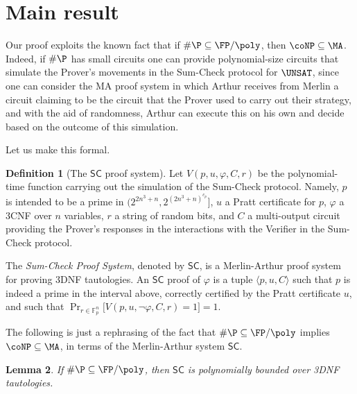 \documentclass[11pt]{article}
\renewcommand{\SC}{\mathsf{SC}}
\theoremstyle{definition}
\newtheorem{definition}{Definition}[section]
\theoremstyle{plain}
\newtheorem{lemma}[definition]{Lemma}
\theoremstyle{remark}
\newcommand{\bF}{\mathbb{F}}
\begin{document}
\section{Main result}
Our proof exploits the known fact that if $\#\P \subseteq \FP/\poly$, then $\coNP \subseteq \MA$. Indeed, if $\#\P$ has small circuits one can provide polynomial-size circuits that simulate the Prover's movements in the Sum-Check protocol for $\UNSAT$, since one can consider the MA proof system in which Arthur receives from Merlin a circuit claiming to be the circuit that the Prover used to carry out their strategy, and with the aid of randomness, Arthur can execute this on his own and decide based on the outcome of this simulation.

Let us make this formal.

\begin{definition}[The $\SC$ proof system]\label{def:sc}
Let $V(p, u, \varphi, C, r)$ be the polynomial-time function carrying out the simulation of the Sum-Check protocol. Namely, $p$ is intended to be a prime in $(2^{2n^3 + n}, 2^{{(2n^3+n)}^{c_p}}]$, $u$ a Pratt certificate for $p$, $\varphi$ a 3CNF over $n$ variables, $r$ a string of random bits, and $C$ a multi-output circuit providing the Prover's responses in the interactions with the Verifier in the Sum-Check protocol.

The \emph{Sum-Check Proof System}, denoted by $\SC$, is a Merlin-Arthur proof system for proving 3DNF tautologies. An $\SC$ proof of $\varphi$ is a tuple $\langle p,u, C \rangle$ such that $p$ is indeed a prime in the interval above, correctly certified by the Pratt certificate $u$, and such that $\Pr_{r\in\bF_p^n}\big[V(p,u,\neg\varphi,C,r)=1\big]=1$.
\end{definition}

The following is just a rephrasing of the fact that $\#\P \subseteq \FP/\poly$ implies $\coNP \subseteq \MA$, in terms of the Merlin-Arthur system $\SC$.

\begin{lemma}\label{SCBounded}
    If $\#\P \subseteq \FP/\poly$, then $\SC$ is polynomially bounded over 3DNF tautologies.
\end{lemma}
\end{document}
